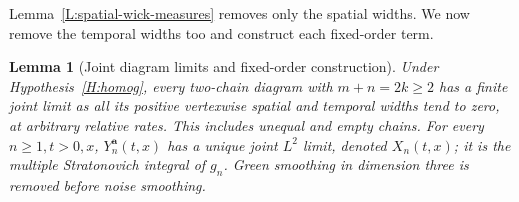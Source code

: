 \documentclass[12pt,oneside,openany]{book}
\makeatletter
\let\lean@pending\@empty
\newcommand{\LeanMarker}[1]{\gdef\lean@pending{#1}}
\numberwithin{equation}{section}
\newtheorem{lemma}[theorem]{Lemma}
\theoremstyle{nogostyle}
\theoremstyle{definition}
\makeatother
\begin{document}
Lemma~\ref{L:spatial-wick-measures} removes only the spatial widths. We now
remove the temporal widths too and construct each fixed-order term.
\LeanMarker{L:joint-fixed-order}%
\begin{lemma}[Joint diagram limits and fixed-order construction]
  \label{L:joint-fixed-order}
  Under Hypothesis~\ref{H:homog}, every two-chain diagram with $m+n = 2k \ge 2$
  has a finite joint limit as all its positive vertexwise spatial and temporal
  widths tend to zero, at arbitrary relative rates. This includes unequal and
  empty chains. For every $n \ge 1,t > 0,x$, $Y_n^{\boldsymbol a}(t,x)$ has a
  unique joint $L^2$ limit, denoted $X_n(t,x)$; it is the multiple Stratonovich
  integral of $g_n$. Green smoothing in dimension three is removed before noise
  smoothing.
\end{lemma}
\end{document}
